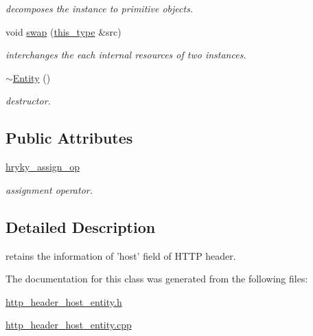 \begin{DoxyCompactItemize}
\begin{DoxyCompactList}\small\item\em decomposes the instance to primitive objects. \end{DoxyCompactList}\item 
\hypertarget{classhryky_1_1http_1_1header_1_1host_1_1_entity_a29148cf115460668791da0c69ed04d6b}{void \hyperlink{classhryky_1_1http_1_1header_1_1host_1_1_entity_a29148cf115460668791da0c69ed04d6b}{swap} (\hyperlink{classhryky_1_1http_1_1header_1_1host_1_1_entity_a28617ab18ca61481399d29706081946f}{this\-\_\-type} \&src)}\label{classhryky_1_1http_1_1header_1_1host_1_1_entity_a29148cf115460668791da0c69ed04d6b}

\begin{DoxyCompactList}\small\item\em interchanges the each internal resources of two instances. \end{DoxyCompactList}\item 
\hypertarget{classhryky_1_1http_1_1header_1_1host_1_1_entity_a933d1734478bbf1d9e2b93a7fddf5b73}{\hyperlink{classhryky_1_1http_1_1header_1_1host_1_1_entity_a933d1734478bbf1d9e2b93a7fddf5b73}{$\sim$\-Entity} ()}\label{classhryky_1_1http_1_1header_1_1host_1_1_entity_a933d1734478bbf1d9e2b93a7fddf5b73}

\begin{DoxyCompactList}\small\item\em destructor. \end{DoxyCompactList}\end{DoxyCompactItemize}
\subsection*{Public Attributes}
\begin{DoxyCompactItemize}
\item 
\hypertarget{classhryky_1_1http_1_1header_1_1host_1_1_entity_a904b10da775362e32700b0c854222d7e}{\hyperlink{classhryky_1_1http_1_1header_1_1host_1_1_entity_a904b10da775362e32700b0c854222d7e}{hryky\-\_\-assign\-\_\-op}}\label{classhryky_1_1http_1_1header_1_1host_1_1_entity_a904b10da775362e32700b0c854222d7e}

\begin{DoxyCompactList}\small\item\em assignment operator. \end{DoxyCompactList}\end{DoxyCompactItemize}


\subsection{Detailed Description}
retains the information of 'host' field of H\-T\-T\-P header. 

The documentation for this class was generated from the following files\-:\begin{DoxyCompactItemize}
\item 
\hyperlink{http__header__host__entity_8h}{http\-\_\-header\-\_\-host\-\_\-entity.\-h}\item 
\hyperlink{http__header__host__entity_8cpp}{http\-\_\-header\-\_\-host\-\_\-entity.\-cpp}\end{DoxyCompactItemize}
